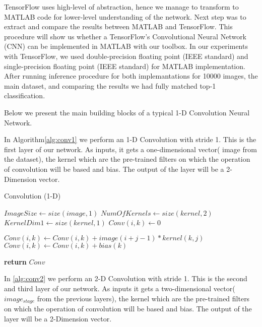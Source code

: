 TensorFlow uses high-level of abstraction, hence we manage to transform to MATLAB code for lower-level understanding of the network. Next step was to extract and compare the results between MATLAB and TensorFlow. This procedure will show us whether a TensorFlow’s Convolutional Neural Network (CNN) can be implemented in MATLAB with our toolbox. In our experiments with TensorFlow, we used double-precision floating point (IEEE standard) and single-precision floating point (IEEE standard) for MATLAB implementation. After running inference procedure for both implemantations for 10000 images, the main dataset, and comparing the results we had fully matched top-1 classification.


Below we present the main building blocks of a typical 1-D Convolution Neural Network.

In Algorithm\ref{alg:conv1} we perform an 1-D Convolution with stride 1. This is the first layer of our network. As inputs, it gets a one-dimensional vector( image from the dataset), the kernel which are the pre-trained filters on which the operation of convolution will be based and bias. The output of the layer will be a 2-Dimension vector.

\begin{algorithm}[H]
\caption{Convolution (1-D) }\label{alg:conv1}
\begin{algorithmic}[1]
\State $ImageSize\gets size(image,1)$ 
\State $NumOfKernels \gets size(kernel,2)$ 
\State $KernelDim1 \gets size(kernel,1)$ 
\State $Conv(i,k)\gets 0$
\EndFor 
\EndFor 


\State $Conv(i,k)\gets Conv(i,k) + image(i+j-1)*kernel(k,j)$
\EndFor 
\State $Conv(i,k)\gets Conv(i,k) + bias(k)$
\EndFor 
\EndFor 

\State \textbf{return} $Conv$       
\EndProcedure
\end{algorithmic}
\end{algorithm}

In \ref{alg:conv2} we perform an 2-D Convolution with stride 1. This is the second and third layer of our network. As inputs it gets a two-dimensional vector($image_{stage}$ from the previous layers), the kernel which are the pre-trained filters on which the operation of convolution will be based and bias. The output of the layer will be a 2-Dimension vector.

